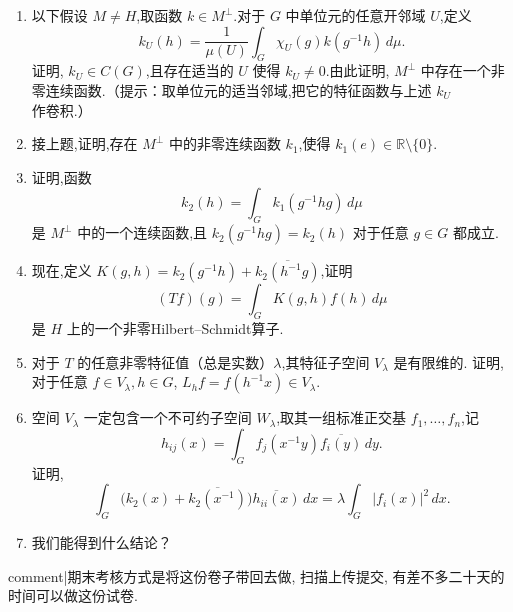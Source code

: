 \begin{enumerate}
\begin{enumerate}[label=(\alph*)]
\item 以下假设 $M\neq H$,取函数 $k\in M^\perp$.对于 $G$ 中单位元的任意开邻域 $U$,定义
$$
k_U(h)=\frac{1}{\mu(U)}\int_G \chi_U(g) k(g^{-1}h)\,d\mu.
$$
证明, $k_U\in C(G)$,且存在适当的 $U$ 使得 $k_U\neq 0$.由此证明, $M^\perp$ 中存在一个非零连续函数.（提示：取单位元的适当邻域,把它的特征函数与上述 $k_U$ 作卷积.）

\item 接上题,证明,存在 $M^\perp$ 中的非零连续函数 $k_1$,使得 $k_1(e)\in \mathbb{R}\setminus\{0\}$.

\item 证明,函数
$$
k_2(h)=\int_G k_1(g^{-1}hg)\,d\mu
$$
是 $M^\perp$ 中的一个连续函数,且 $k_2(g^{-1}hg)=k_2(h)$ 对于任意 $g\in G$ 都成立.

\item 现在,定义 $K(g,h)=k_2(g^{-1}h)+\overline{k_2(h^{-1}g)}$,证明
$$
(Tf)(g)=\int_G K(g,h)f(h)\,d\mu
$$
是 $H$ 上的一个非零Hilbert--Schmidt算子.

\item 对于 $T$ 的任意非零特征值（总是实数）$\lambda$,其特征子空间 $V_\lambda$ 是有限维的.
证明,对于任意 $f\in V_\lambda,h\in G$, $L_h f=f(h^{-1}x)\in V_\lambda$.

\item 空间 $V_\lambda$ 一定包含一个不可约子空间 $W_\lambda$,取其一组标准正交基 $f_1,\dots,f_n$,记
$$
h_{ij}(x)=\int_G f_j(x^{-1}y)\overline{f_i(y)}\,dy.
$$
证明,
$$
\int_G \bigl(k_2(x)+\overline{k_2(x^{-1})}\bigr) \overline{h_{ii}(x)}\,dx = \lambda \int_G |f_i(x)|^2\,dx.
$$

\item 我们能得到什么结论？
\end{enumerate}
{{comment|期末考核方式是将这份卷子带回去做, 扫描上传提交, 有差不多二十天的时间可以做这份试卷.}}
\end{enumerate}